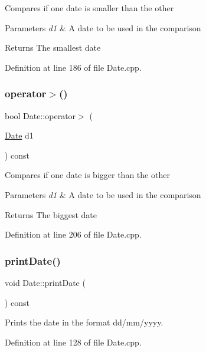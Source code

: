 Compares if one date is smaller than the other 
\begin{DoxyParams}{Parameters}
{\em d1} & A date to be used in the comparison \\
\hline
\end{DoxyParams}
\begin{DoxyReturn}{Returns}
The smallest date 
\end{DoxyReturn}


Definition at line 186 of file Date.\+cpp.

\mbox{\label{classDate_aa71c76d80b90438a9b507e8fba4beaa4}} 
\subsubsection{\texorpdfstring{operator$>$()}{operator>()}}
{\footnotesize\ttfamily bool Date\+::operator$>$ (\begin{DoxyParamCaption}\item[{\hyperlink{classDate}{Date}}]{d1 }\end{DoxyParamCaption}) const}

Compares if one date is bigger than the other 
\begin{DoxyParams}{Parameters}
{\em d1} & A date to be used in the comparison \\
\hline
\end{DoxyParams}
\begin{DoxyReturn}{Returns}
The biggest date 
\end{DoxyReturn}


Definition at line 206 of file Date.\+cpp.

\mbox{\label{classDate_a6d5873842b1ede5d95399220d7994c7b}} 
\subsubsection{\texorpdfstring{print\+Date()}{printDate()}}
{\footnotesize\ttfamily void Date\+::print\+Date (\begin{DoxyParamCaption}{ }\end{DoxyParamCaption}) const}

Prints the date in the format dd/mm/yyyy. 

Definition at line 128 of file Date.\+cpp.

